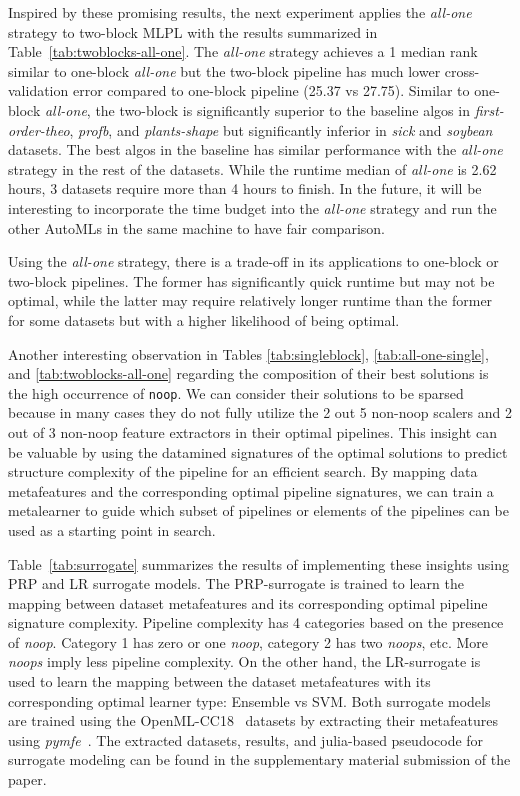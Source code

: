 \documentclass{juliacon}
\begin{document}
Inspired by these promising results, the next experiment applies the
\emph{all-one} strategy to two-block MLPL with the results summarized in Table~\ref{tab:twoblocks-all-one}. 
The \emph{all-one} strategy achieves a 1 median rank similar to one-block \emph{all-one} 
but the two-block pipeline has much lower cross-validation error compared to one-block pipeline (25.37 vs 27.75).
Similar to one-block \emph{all-one}, the two-block is significantly superior to the 
baseline algos in \emph{first-order-theo}, \emph{profb}, and \emph{plants-shape}
but significantly inferior in \emph{sick} and \emph{soybean} datasets. The best algos in the baseline
has similar performance with the \emph{all-one} strategy in the rest of the datasets.
While the runtime median of \emph{all-one} is
2.62 hours, 3 datasets require more than 4 hours to finish.  
In the future, it will be interesting to incorporate the time budget into the 
\emph{all-one} strategy and run the other AutoMLs in the same machine to have fair comparison.

\vskip 6pt

Using the \emph{all-one} strategy, there is a trade-off in its applications
to one-block or two-block pipelines. The former has significantly quick runtime
but may not be optimal, while the latter may require relatively longer runtime
than the former for some datasets but with a higher likelihood of being optimal.

\vskip 6pt

Another interesting observation in Tables \ref{tab:singleblock},
\ref{tab:all-one-single}, and \ref{tab:twoblocks-all-one}
regarding the composition of their best solutions
is the high occurrence of \texttt{noop}.
We can consider their solutions to be sparsed because in many cases
they do not fully utilize
the 2 out 5 non-noop scalers and 2 out of 3 non-noop feature extractors in their optimal
pipelines.  This insight can be valuable by using the
datamined signatures of the optimal
solutions to predict structure complexity of the pipeline for an efficient search.
By mapping data metafeatures and the corresponding optimal pipeline signatures,
we can train a metalearner to guide which subset of pipelines or elements
of the pipelines can be used as a starting point in search.

\vskip 6pt

Table~\ref{tab:surrogate} summarizes the results of implementing these
insights using PRP and LR surrogate models.
The PRP-surrogate is trained to learn the mapping between 
dataset metafeatures and its corresponding optimal pipeline 
signature complexity. Pipeline complexity has 4 categories based
on the presence of \emph{noop}. Category 1 has zero or one \emph{noop}, 
category 2 has two \emph{noops}, etc. More \emph{noops} imply 
less pipeline complexity. On the other hand, the LR-surrogate
is used to learn the mapping between the dataset metafeatures 
with its corresponding optimal learner type: Ensemble vs SVM. Both
surrogate models are trained using the OpenML-CC18~\cite{openmlcc18} 
datasets by extracting their metafeatures using \emph{pymfe}~\cite{pymfe2020}. The extracted datasets, results, and julia-based pseudocode for surrogate modeling can be found in the supplementary material submission of the paper.
\end{document}
